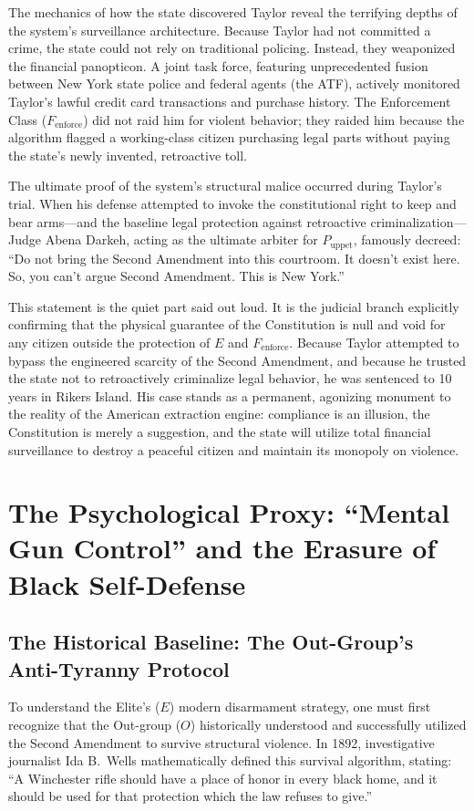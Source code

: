 \documentclass[12pt,openany]{book}
\begin{document}
The mechanics of how the state discovered Taylor reveal the terrifying depths of the system's surveillance architecture. Because Taylor had not committed a crime, the state could not rely on traditional policing. Instead, they weaponized the financial panopticon. A joint task force, featuring unprecedented fusion between New York state police and federal agents (the ATF), actively monitored Taylor's lawful credit card transactions and purchase history. The Enforcement Class ($F_{\text{enforce}}$) did not raid him for violent behavior; they raided him because the algorithm flagged a working-class citizen purchasing legal parts without paying the state's newly invented, retroactive toll.

The ultimate proof of the system's structural malice occurred during Taylor's trial. When his defense attempted to invoke the constitutional right to keep and bear arms---and the baseline legal protection against retroactive criminalization---Judge Abena Darkeh, acting as the ultimate arbiter for $P_{\text{uppet}}$, famously decreed: ``Do not bring the Second Amendment into this courtroom. It doesn't exist here. So, you can't argue Second Amendment. This is New York.''

This statement is the quiet part said out loud. It is the judicial branch explicitly confirming that the physical guarantee of the Constitution is null and void for any citizen outside the protection of $E$ and $F_{\text{enforce}}$. Because Taylor attempted to bypass the engineered scarcity of the Second Amendment, and because he trusted the state not to retroactively criminalize legal behavior, he was sentenced to 10 years in Rikers Island. His case stands as a permanent, agonizing monument to the reality of the American extraction engine: compliance is an illusion, the Constitution is merely a suggestion, and the state will utilize total financial surveillance to destroy a peaceful citizen and maintain its monopoly on violence.

\section{The Psychological Proxy: ``Mental Gun Control'' and the Erasure of Black Self-Defense}

\subsection{The Historical Baseline: The Out-Group's Anti-Tyranny Protocol}
To understand the Elite's ($E$) modern disarmament strategy, one must first recognize that the Out-group ($O$) historically understood and successfully utilized the Second Amendment to survive structural violence. In 1892, investigative journalist Ida B.\ Wells mathematically defined this survival algorithm, stating: ``A Winchester rifle should have a place of honor in every black home, and it should be used for that protection which the law refuses to give.''
\end{document}
